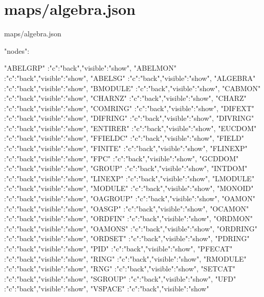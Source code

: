 \documentclass{article}
\begin{document}
\section{maps/algebra.json}
\begin{chunk}{maps/algebra.json}
{"nodes":
 {
  "ABELGRP" :{"c":"back","visible":"show"},
  "ABELMON" :{"c":"back","visible":"show"},
  "ABELSG"  :{"c":"back","visible":"show"},
  "ALGEBRA" :{"c":"back","visible":"show"}, 
  "BMODULE" :{"c":"back","visible":"show"},
  "CABMON"  :{"c":"back","visible":"show"},
  "CHARNZ"  :{"c":"back","visible":"show"},
  "CHARZ"   :{"c":"back","visible":"show"},
  "COMRING" :{"c":"back","visible":"show"},
  "DIFEXT"  :{"c":"back","visible":"show"},
  "DIFRING" :{"c":"back","visible":"show"},
  "DIVRING" :{"c":"back","visible":"show"}, 
  "ENTIRER" :{"c":"back","visible":"show"}, 
  "EUCDOM"  :{"c":"back","visible":"show"}, 
  "FFIELDC" :{"c":"back","visible":"show"},
  "FIELD"   :{"c":"back","visible":"show"},
  "FINITE"  :{"c":"back","visible":"show"},
  "FLINEXP" :{"c":"back","visible":"show"},
  "FPC"     :{"c":"back","visible":"show"},
  "GCDDOM"  :{"c":"back","visible":"show"},
  "GROUP"   :{"c":"back","visible":"show"},
  "INTDOM"  :{"c":"back","visible":"show"},
  "LINEXP"  :{"c":"back","visible":"show"},
  "LMODULE" :{"c":"back","visible":"show"},
  "MODULE"  :{"c":"back","visible":"show"},
  "MONOID"  :{"c":"back","visible":"show"},
  "OAGROUP" :{"c":"back","visible":"show"},
  "OAMON"   :{"c":"back","visible":"show"},
  "OASGP"   :{"c":"back","visible":"show"},
  "OCAMON"  :{"c":"back","visible":"show"},
  "ORDFIN"  :{"c":"back","visible":"show"},
  "ORDMON"  :{"c":"back","visible":"show"},
  "OAMONS"  :{"c":"back","visible":"show"},
  "ORDRING" :{"c":"back","visible":"show"},
  "ORDSET"  :{"c":"back","visible":"show"},
  "PDRING"  :{"c":"back","visible":"show"},
  "PID"     :{"c":"back","visible":"show"},
  "PFECAT"  :{"c":"back","visible":"show"},
  "RING"    :{"c":"back","visible":"show"},
  "RMODULE" :{"c":"back","visible":"show"},
  "RNG"     :{"c":"back","visible":"show"},
  "SETCAT"  :{"c":"back","visible":"show"},
  "SGROUP"  :{"c":"back","visible":"show"},
  "UFD"     :{"c":"back","visible":"show"},
  "VSPACE"  :{"c":"back","visible":"show"}

}}
\end{chunk}
\end{document}
